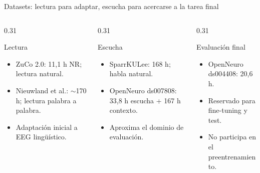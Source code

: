 \documentclass[aspectratio=169,10pt]{beamer}
\begin{document}
\begin{frame}[c]{Datasets: lectura para adaptar, escucha para acercarse a la tarea final}
  \small
  \begin{columns}[c,totalwidth=\linewidth]
    \begin{column}{0.31\linewidth}
      \begin{block}{Lectura}
        \begin{minipage}[t][29mm][t]{\linewidth}
        \begin{itemize}
          \item ZuCo 2.0: 11,1 h NR; lectura natural.
          \item Nieuwland et al.: $\sim$170 h; lectura palabra a palabra.
          \item Adaptación inicial a EEG lingüístico.
        \end{itemize}
        \end{minipage}
      \end{block}
    \end{column}

    \begin{column}{0.31\linewidth}
      \begin{block}{Escucha}
        \begin{minipage}[t][29mm][t]{\linewidth}
        \begin{itemize}
          \item SparrKULee: 168 h; habla natural.
          \item OpenNeuro ds007808: 33,8 h escucha + 167 h contexto.
          \item Aproxima el dominio de evaluación.
        \end{itemize}
        \end{minipage}
      \end{block}
    \end{column}

    \begin{column}{0.31\linewidth}
      \begin{alertblock}{Evaluación final}
        \begin{minipage}[t][29mm][t]{\linewidth}
        \begin{itemize}
          \item OpenNeuro ds004408: 20,6 h.
          \item Reservado para fine-tuning y test.
          \item No participa en el preentrenamiento.
        \end{itemize}
        \end{minipage}
      \end{alertblock}
    \end{column}
  \end{columns}


\end{frame}
\end{document}
